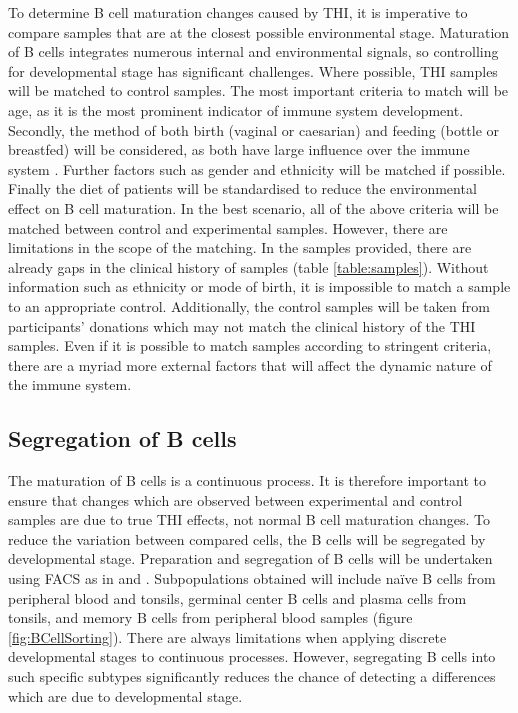 \documentclass[12pt]{article}
\newcommand{\naive}{na\"{i}ve }
\begin{document}
				To determine B cell maturation changes caused by THI, it is imperative to compare samples that are at the closest possible environmental stage.
				Maturation of B cells integrates numerous internal and environmental signals, so controlling for developmental stage has significant challenges. 
				Where possible, THI samples will be matched to control samples. 
				The most important criteria to match will be age, as it is the most prominent indicator of immune system development. 
				Secondly, the method of both birth (vaginal or caesarian) and feeding (bottle or breastfed) will be considered, as both have large influence over the immune system \citep{Jakobsson14,Cho13,Brandtzaeg03,Rogier14,Gomez14}.
				Further factors such as gender and ethnicity will be matched if possible. 
				Finally the diet of patients will be standardised to reduce the environmental effect on B cell maturation.
				In the best scenario, all of the above criteria will be matched between control and experimental samples. 
				However, there are limitations in the scope of the matching. 
				In the samples provided, there are already gaps in the clinical history of samples (table \ref{table:samples}). 
				Without information such as ethnicity or mode of birth, it is impossible to match a sample to an appropriate control. 
				Additionally, the control samples will be taken from participants' donations which may not match the clinical history of the THI samples.
				Even if it is possible to match samples according to stringent criteria, there are a myriad more external factors that will affect the dynamic nature of the immune system.
				 
				
		
		\subsection{Segregation of B cells}
			
			The maturation of B cells is a continuous process. 
			It is therefore important to ensure that changes which are observed between experimental and control samples are due to true THI effects, not normal B cell maturation changes.
			To reduce the variation between compared cells, the B cells will be segregated by developmental stage. 
			Preparation and segregation of B cells will be undertaken using FACS as in \citet{Kulis15} and \citet{Oakes16}.
			Subpopulations obtained will include \naive B cells from peripheral blood and tonsils, germinal center B cells and plasma cells from tonsils, and memory B cells from peripheral blood samples (figure \ref{fig:BCellSorting}). 
			There are always limitations when applying discrete developmental stages to continuous processes.
			However, segregating B cells into such specific subtypes significantly reduces the chance of detecting a differences which are due to developmental stage. 
			
\end{document}
